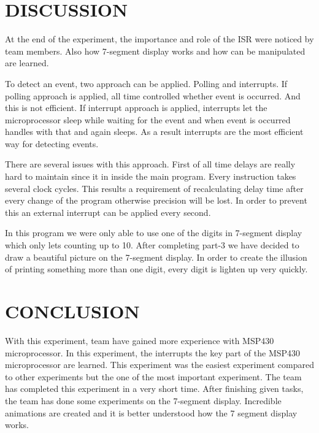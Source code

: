 \documentclass[pdftex,12pt,a4paper]{article}
\begin{document}
\section{DISCUSSION}

At the end of the experiment, the importance and role of the ISR were noticed by team members. Also how 7-segment display works and how can be manipulated are learned.

To detect an event, two approach can be applied. Polling and interrupts. If polling approach is applied, all time controlled whether event is occurred. And this is not efficient. If interrupt approach is applied, interrupts let the microprocessor sleep while waiting for the event and when event is occurred handles with that and again sleeps. As a result interrupts are the most efficient way for detecting events. 

There are several issues with this approach. First of all time delays are really hard to maintain since it in inside the main program. Every instruction takes several clock cycles. This results a requirement of recalculating delay time after every change of the program otherwise precision will be lost. In order to prevent this an external interrupt can be applied every second.

In this program we were only able to use one of the digits in 7-segment display which only lets counting up to 10. After completing part-3 we have decided to draw a beautiful picture on the 7-segment display. In order to create the illusion of printing something more than one digit, every digit is lighten up very quickly. 


\newpage
\section{CONCLUSION}

With this experiment, team have gained more experience with MSP430 microprocessor. In this experiment, the interrupts the key part of the MSP430 microprocessor are learned. This experiment was the easiest experiment compared to other experiments but the one of the most important experiment. The team has completed this experiment in a very short time. After finishing given tasks, the team has done some experiments on the 7-segment display. Incredible animations are created and it is better understood how the 7 segment display works.



\nocite{overleaf}
\nocite{reportGuide}
\newpage
{}



\end{document}
